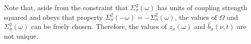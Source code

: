 Note that, aside from the constraint that $\Sigma_\sigma^2(\omega)$ has units of coupling strength squared and obeys that property $\Sigma_\sigma^2(-\omega) = -\Sigma_\sigma^2(\omega)$, the values of $\Omega$ and $\Sigma_\sigma^2(\omega)$ can be freely chosen. Therefore, the values of $z_\sigma(\omega)$ and $\hat{b}_\sigma(\nu,t)$ are not unique.















